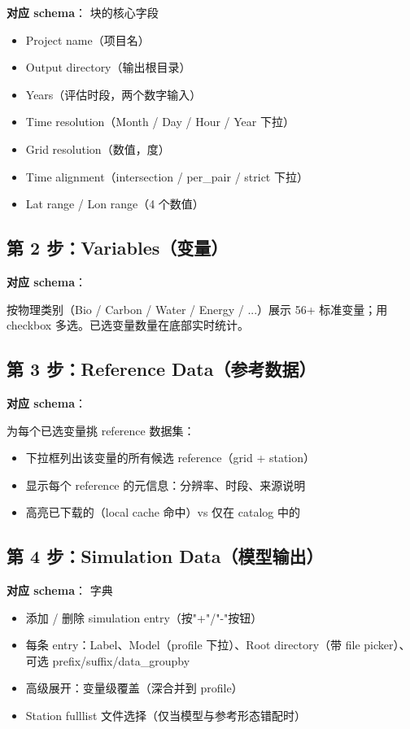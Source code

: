 \textbf{对应 schema}： 块的核心字段

\begin{itemize}
  \item Project name（项目名）
  \item Output directory（输出根目录）
  \item Years（评估时段，两个数字输入）
  \item Time resolution（Month / Day / Hour / Year 下拉）
  \item Grid resolution（数值，度）
  \item Time alignment（intersection / per\_pair / strict 下拉）
  \item Lat range / Lon range（4 个数值）
\end{itemize}

\subsection{第 2 步：Variables（变量）}

\textbf{对应 schema}：

按物理类别（Bio / Carbon / Water / Energy / ...）展示 56+ 标准变量；用 checkbox 多选。已选变量数量在底部实时统计。

\subsection{第 3 步：Reference Data（参考数据）}

\textbf{对应 schema}：

为每个已选变量挑 reference 数据集：

\begin{itemize}
  \item 下拉框列出该变量的所有候选 reference（grid + station）
  \item 显示每个 reference 的元信息：分辨率、时段、来源说明
  \item 高亮已下载的（local cache 命中）vs 仅在 catalog 中的
\end{itemize}

\subsection{第 4 步：Simulation Data（模型输出）}

\textbf{对应 schema}： 字典

\begin{itemize}
  \item 添加 / 删除 simulation entry（按"+"/"-"按钮）
  \item 每条 entry：Label、Model（profile 下拉）、Root directory（带 file picker）、可选 prefix/suffix/data\_groupby
  \item 高级展开：变量级覆盖（深合并到 profile）
  \item Station fulllist 文件选择（仅当模型与参考形态错配时）
\end{itemize}

